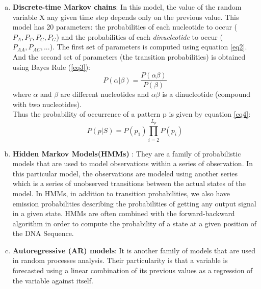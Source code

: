\documentclass[10pt,twocolumn,letterpaper]{article}
\begin{document}
{\begin{itemize}
{\begin{enumerate}[i.]
\begin{enumerate}[a.]
               \item \textbf{Discrete-time Markov chains}: In this model, the value of the random variable X any given time step depends only on the previous value.
               This model has 20 parameters: the probabilities of each nucleotide to occur (\(P_A, P_T, P_C, P_G\)) and the probabilities of each \textit{dinucleotide} to occur (\(P_{AA}, P_{AC}, ...\)).
               The first set of parameters is computed using equation \ref{eq2}.
               And the second set of parameters (the transition probabilities) is obtained \cite{singh} using Bayes Rule (\ref{eq3}):\\
               \begin{equation}
                   P(\alpha|\beta) = \frac{P(\alpha \beta)}{P(\beta)}
                \label{eq3}
               \end{equation}
               where \(\alpha\) and \(\beta\) are different nucleotides and \(\alpha \beta \) is a dinucleotide (compound with two nucleotides).\\ 
               Thus the probability of occurrence of a pattern p is given by equation \ref{eq4}:
               \begin{equation}
                   P(p|S) = P(p_1)\prod_{i=2}^{L_p} P(p_i)
                \label{eq4}
               \end{equation}
               \item \textbf{Hidden Markov Models(HMMs)} \cite{tommy}: They are a family of probabilistic models that are used to model observations within a series of observation. In this particular model,
               the observations are modeled using another series which is a series of unobserved transitions between the actual states of the model. In HMMs, in addition to transition probabilities, we also have 
               emission probabilities describing the probabilities of getting any output signal in a given state.
               HMMs are often combined with the forward-backward \cite{forward_backward} algorithm in order to compute the probability of a state at a given position of the DNA Sequence.\\ 
               
               \item \textbf{Autoregressive (AR) models}\cite{chakravarthy2004autoregressive}: It is another family of models that are used in random processes analysis. Their particularity is that a variable is forecasted
               using a linear combination of its previous values as a regression of the variable against itself.
        \end{enumerate}
       \end{enumerate}
   }
    \end{itemize}
 }
\end{document}

